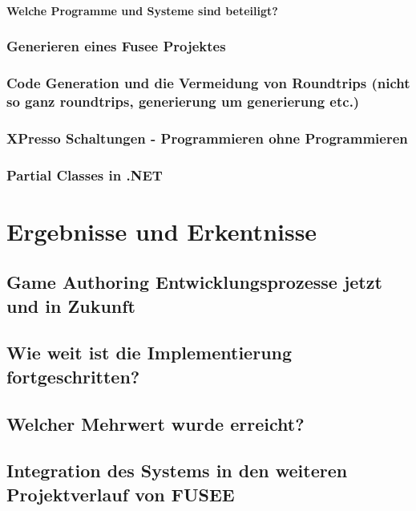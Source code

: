 \documentclass[pagesize, paper=a4, fontsize=12pt,titlepage=true, headings=small, headnosepline, abstractoff, liststotoc, nochapterprefix, plainheadsepline, twoside]{scrreprt}
\begin{document}
\subsubsection{Welche Programme und Systeme sind beteiligt?}
\subsection{Generieren eines Fusee Projektes}
\subsection{Code Generation und die Vermeidung von Roundtrips (nicht so ganz roundtrips, generierung um generierung etc.)}
\subsection{XPresso Schaltungen - Programmieren ohne Programmieren}
\subsection{Partial Classes in .NET}



\chapter{Ergebnisse und Erkentnisse}
\section{Game Authoring Entwicklungsprozesse jetzt und in Zukunft}
\section{Wie weit ist die Implementierung fortgeschritten?}
\section{Welcher Mehrwert wurde erreicht?}
\section{Integration des Systems in den weiteren Projektverlauf von FUSEE}


\end{document}
